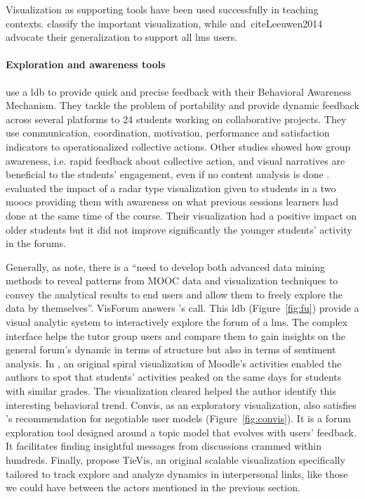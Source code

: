 \documentclass[a4paper,twoside]{article}
\begin{document}
Visualization as supporting tools have been used successfully in teaching contexts.  \cite{Heer2012} classify the important visualization, while \cite{Emmons2017} and\ cite{Leeuwen2014} advocate their generalization to support all \gls{lms} users.

\paragraph{Exploration and awareness tools}
\cite{Medina2016} use a \gls{ldb} to provide quick and precise feedback with their Behavioral Awareness Mechanism.  They tackle the problem of portability and provide dynamic feedback across several platforms to 24 students working on collaborative projects.  They use communication, coordination, motivation, performance and satisfaction indicators to operationalized collective actions.  Other studies showed how group awareness, i.e.  rapid feedback about collective action, and visual narratives \citep{Yousuf2015} are beneficial to the students' engagement, even if no content analysis is done \citep{May2011}.
\cite{Davis2017} evaluated the impact of a radar type visualization given to students in a two \glspl{mooc} providing them with awareness on what previous sessions learners had done at the same time of the course.  Their visualization had a positive impact on older students but it did not improve significantly the younger students' activity in the forums.

Generally, as \cite{Qu2015} note, there is a ``need to develop both advanced data mining methods to reveal patterns from MOOC data and visualization techniques to convey the analytical results to end users and allow them to freely explore the data by themselves''.
VisForum \cite{Fu2017} answers \cite{Qu2015}'s call.  This \gls{ldb} (Figure~\ref{fig:fu}) provide a visual analytic system to interactively explore the forum of a \gls{lms}.  The complex interface helps the tutor group users and compare them to gain insights on the general forum's dynamic in terms of structure but also in terms of sentiment analysis.
In \cite{Aguilar2015}, an original spiral visualization of Moodle's activities enabled the authors to spot that students' activities peaked on the same days for students with similar grades.  The visualization cleared helped the author identify this interesting behavioral trend.
Convis, as an exploratory visualization, also satisfies \cite{Bull2016}'s recommendation for negotiable user models (Figure~\ref{fig:convis}).  It is a forum exploration tool designed around a topic model that evolves with users' feedback.   It facilitates finding insightful messages from discussions
crammed within hundreds.
Finally, \cite{Guo2017} propose TieVis, an original scalable visualization specifically tailored to track explore and analyze dynamics in interpersonal links, like those we could have between the actors mentioned in the previous section.
\end{document}
